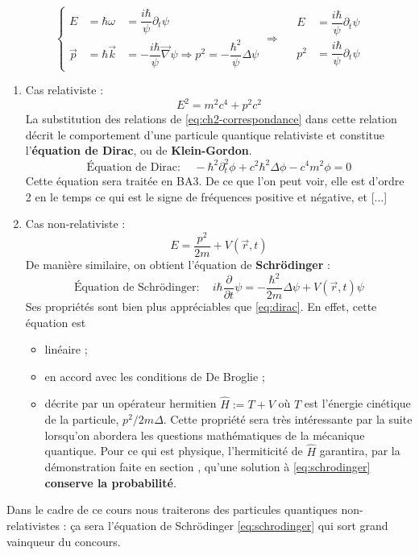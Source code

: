 \documentclass[12pt, a4paper]{book}
\begin{document}
\begin{enumerate}[label =  (\alph*)]
\begin{equation} \label{eq:ch2-correspondance}
\left\{ \begin{array}{lll}
E &= \hbar \omega &= \dfrac{i\hbar}{\psi} \partial_t \psi \\
\vec p &= \hbar \vec k &= -\dfrac{i\hbar}{\psi} \vec \nabla \psi \Rightarrow p^2 = -\dfrac{\hbar ^2}{\psi} \Delta \psi
\end{array} \right. \Longrightarrow \quad \boxed{\begin{array}{ll}
E &=\dfrac{i\hbar}{\psi} \partial_t \psi \\
p^2 &=  \dfrac{i\hbar}{\psi} \partial_t \psi
\end{array}}
\end{equation}

\begin{enumerate}[label = \roman*)]
\item Cas relativiste : 
$$E^2 = m^2 c^4 + p^2 c^2$$
La substitution des relations de \eqref{eq:ch2-correspondance} dans cette relation décrit le comportement d'une particule quantique relativiste et constitue l'\textbf{équation de Dirac}, ou de \textbf{Klein-Gordon}.
\begin{equation} \label{eq:dirac}
\boxed{\text{Équation de Dirac} : \quad -\hbar ^2 \partial_t ^2 \phi + c^2 \hbar ^2 \Delta \phi - c^4 m^2 \phi = 0}
\end{equation}
Cette équation sera traitée en BA3. De ce que l'on peut voir, elle est d'ordre 2 en le temps ce qui est le signe de fréquences positive et négative, et [...]
\item Cas non-relativiste :
$$E = \dfrac{p^2}{2m} + V(\vec r, t)$$
De manière similaire, on obtient l'équation de \textbf{Schrödinger} :
\begin{equation} \label{eq:schrodinger}
\boxed{\text{Équation de Schrödinger} : \quad
i\hbar \dfrac{\partial}{\partial t} \psi = -\dfrac{\hbar ^2}{2m} \Delta \psi + V(\vec r, t) \psi}
\end{equation}
Ses propriétés sont bien plus appréciables que \eqref{eq:dirac}. En effet, cette équation est 
\begin{itemize}
\item linéaire ;
\item en accord avec les conditions de De Broglie ;
\item décrite par un opérateur hermitien $\hat{H} := T + V$ où $T$ est l'énergie cinétique de la particule, $p^2/2m \Delta$. Cette propriété sera très intéressante par la suite lorsqu'on abordera les questions mathématiques de la mécanique quantique. Pour ce qui est physique, l'hermiticité de $ \hat{H}$ garantira, par la démonstration faite en section \textbf{}, qu'une solution à \eqref{eq:schrodinger} \textbf{conserve la probabilité}.
\end{itemize}
\end{enumerate}
\end{enumerate}
Dans le cadre de ce cours nous traiterons des particules quantiques non-relativistes : ça sera l'équation de Schrödinger \eqref{eq:schrodinger} qui sort grand vainqueur du concours.
\end{document}
